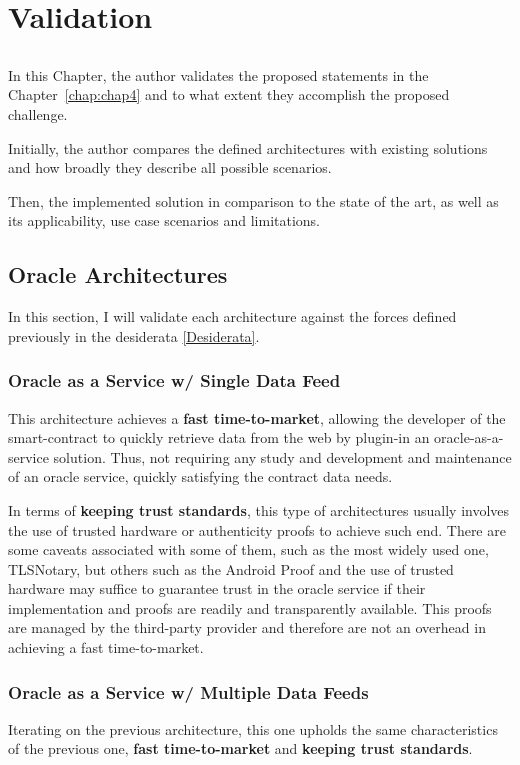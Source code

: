 \chapter{Validation} \label{chap:chap7}

\section*{}
In this Chapter, the author validates the proposed statements in the Chapter~\ref{chap:chap4} and to what extent they accomplish the proposed challenge.

Initially, the author compares the defined architectures with existing solutions and how broadly they describe all possible scenarios.

Then, the implemented solution in comparison to the state of the art, as well as its applicability, use case scenarios and limitations.


\section{Oracle Architectures}
In this section, I will validate each architecture against the forces defined previously in the desiderata \ref{Desiderata}.


\subsection{Oracle as a Service w/ Single Data Feed}\label{OaaS w/SDF}
This architecture achieves a \textbf{fast time-to-market}, allowing the developer of the smart-contract to quickly retrieve data from the web by plugin-in an oracle-as-a-service solution. Thus, not requiring any study and development and maintenance of an oracle service, quickly satisfying the contract data needs.

In terms of \textbf{keeping trust standards}, this type of architectures usually involves the use of trusted hardware or authenticity proofs to achieve such end. There are some caveats associated with some of them, such as the most widely used one, TLSNotary, but others such as the Android Proof and the use of trusted hardware may suffice to guarantee trust in the oracle service if their implementation and proofs are readily and transparently available. This proofs are managed by the third-party provider and therefore are not an overhead in achieving a fast time-to-market.

\subsection{Oracle as a Service w/ Multiple Data Feeds}\label{OaaS w/ MDF}
Iterating on the previous architecture, this one upholds the same characteristics of the previous one, \textbf{fast time-to-market} and \textbf{keeping trust standards}.

